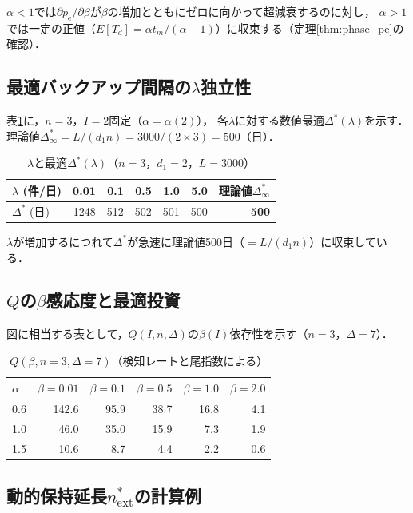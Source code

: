 \documentclass[12pt,a4paper]{article}
\theoremstyle{plain}
\theoremstyle{definition}
\theoremstyle{remark}
\newcommand{\pe}{p_{\mathrm{e}}}
\newcommand{\Dopt}{\Delta^{*}}
\begin{document}
$\alpha<1$では$\partial\pe/\partial\beta$が$\beta$の増加とともにゼロに向かって超減衰するのに対し，
$\alpha>1$では一定の正値（$E[T_d]=\alpha t_m/(\alpha-1)$）に収束する（定理\ref{thm:phase_pe}の確認）．

\subsection{最適バックアップ間隔の$\lambda$独立性}

表\ref{tab:delta_lambda}に，$n=3$，$I=2$固定（$\alpha=\alpha(2)$），
各$\lambda$に対する数値最適$\Dopt(\lambda)$を示す．
理論値$\Dopt_\infty=L/(d_1 n)=3000/(2\times3)=500$（日）．

\begin{table}[h]
\centering
\caption{$\lambda$と最適$\Dopt(\lambda)$（$n=3$，$d_1=2$，$L=3000$）}
\label{tab:delta_lambda}
\begin{tabular}{@{}lrrrrrr@{}}
\toprule
$\lambda$ (件/日) & 0.01 & 0.1 & 0.5 & 1.0 & 5.0 & 理論値$\Dopt_\infty$ \\
\midrule
$\Dopt$ (日) & 1248 & 512 & 502 & 501 & 500 & \textbf{500} \\
\bottomrule
\end{tabular}
\end{table}

$\lambda$が増加するにつれて$\Dopt$が急速に理論値500日（$=L/(d_1 n)$）に収束している．

\subsection{$Q$の$\beta$感応度と最適投資}

図に相当する表として，$Q(I,n,\Delta)$の$\beta(I)$依存性を示す（$n=3$，$\Delta=7$）．

\begin{table}[h]
\centering
\caption{$Q(\beta,n=3,\Delta=7)$（検知レートと尾指数による）}
\label{tab:Q_beta}
\begin{tabular}{@{}lrrrrr@{}}
\toprule
$\alpha$ & $\beta=0.01$ & $\beta=0.1$ & $\beta=0.5$ & $\beta=1.0$ & $\beta=2.0$ \\
\midrule
0.6 & 142.6 & 95.9 & 38.7 & 16.8 & 4.1 \\
1.0 & 46.0 & 35.0 & 15.9 & 7.3 & 1.9 \\
1.5 & 10.6 & 8.7 & 4.4 & 2.2 & 0.6 \\
\bottomrule
\end{tabular}
\end{table}

\subsection{動的保持延長$n_{\mathrm{ext}}^*$の計算例}
\end{document}
